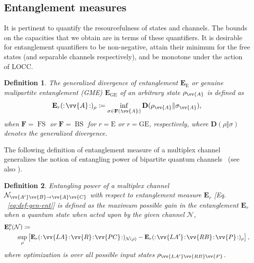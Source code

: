 \documentclass[aps,pra,twocolumn,superscriptaddress,longbibliography]{revtex4-1}
\def\FS{\operatorname{FS}}
\def\BS{\operatorname{BS}}
\newcommand{\mc}[1]{\mathcal{#1}}
\newcommand{\tf}[1]{\textbf{#1}}
\newtheorem{definition}{Definition}
\begin{document}
\subsection{Entanglement measures}\label{sec:EM} 
It is pertinent to quantify the resourcefulness of states and channels. The bounds on the capacities that we obtain are in terms of these quantifiers. It is desirable for entanglement quantifiers to be non-negative, attain their minimum for the free states (and separable channels respectively), and be monotone under the action of LOCC.

\begin{definition}\label{def:gen-div-ent}
The generalized divergence of entanglement $\tf{E}_{\text{E}}$ or genuine mulipartite entanglement (GME) $\tf{E}_\text{GE}$ of an arbitrary state $\rho_{\vv{A}}$ is defined as~\cite{CPV19}
\begin{equation}\label{eq:def-gen-ent}
\tf{E}_{r}(:\!\vv{A}\!:)_{\rho}\coloneqq \inf_{\sigma\in\tf{F}(:\!\vv{A}\!:)}\tf{D}(\rho_{\vv{A}}\Vert\sigma_{\vv{A}}),
\end{equation} 
when $\tf{F}=\FS$ or $\tf{F}=\BS$ for $r=\text{E}$ or $r=\text{GE}$, respectively, where $\tf{D}(\rho\Vert\sigma)$ denotes the generalized divergence. 
\end{definition}

The following definition of entanglement measure of a multiplex channel generalizes the notion of entangling power of bipartite quantum channels~\cite{BHLS03} (see also \cite{KW17,DBW17,D18thesis}). 
\begin{definition}
Entangling power of a multiplex channel $\mc{N}_{\vv{A'}\vv{B}\to\vv{A}\vv{C}}$ with respect to entanglement measure $\tf{E}_{r}$ [Eq. ~\eqref{eq:def-gen-ent}] is defined as the maximum possible gain in the entanglement $\tf{E}_r$ when a quantum state when acted upon by the given channel $\mc{N}$, 
\begin{align}
&\tf{E}_{r}^{p}(\mc{N})\coloneqq\nonumber\\
&\qquad \sup_{\rho}\left[\tf{E}_{r}(:\!\vv{LA}\!:\!\vv{R}\!:\!\vv{PC}\!:)_{\mc{N}(\rho)} -\tf{E}_{r}(:\!\vv{LA'}\!:\!\vv{RB}\!:\!\vv{P}\!:)_{\rho}\right],
\end{align}
where optimization is over all possible input states $\rho_{\vv{LA'}\vv{RB}\vv{P}}$. %
\end{definition}
\end{document}
